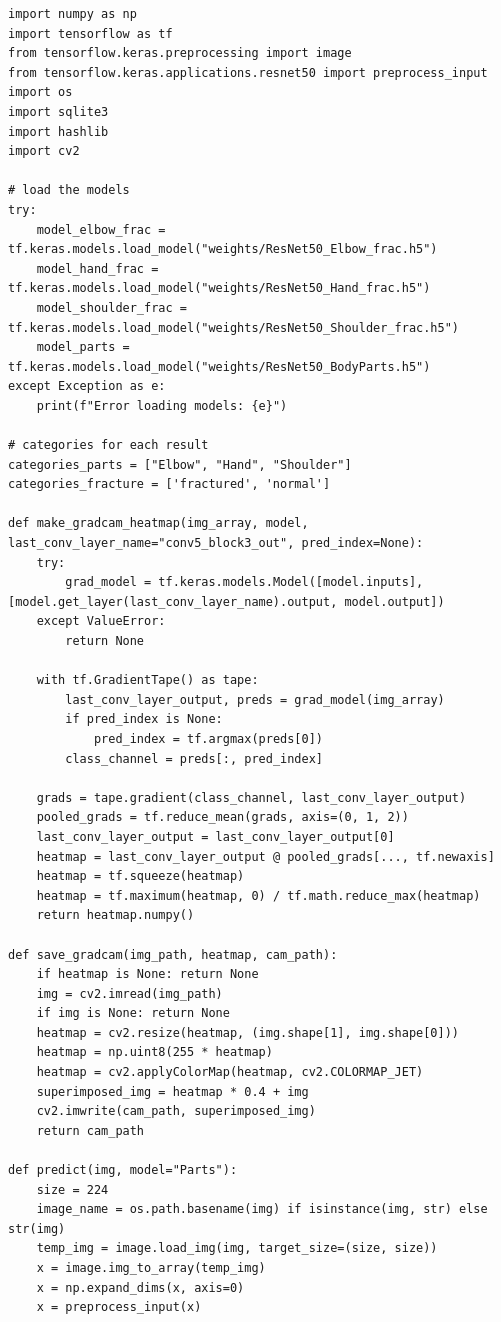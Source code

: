 \documentclass[a4paper,12pt]{report}
\begin{document}
    \begin{lstlisting}[style=pythonstyle]
import numpy as np
import tensorflow as tf
from tensorflow.keras.preprocessing import image
from tensorflow.keras.applications.resnet50 import preprocess_input
import os
import sqlite3
import hashlib
import cv2

# load the models
try:
    model_elbow_frac = tf.keras.models.load_model("weights/ResNet50_Elbow_frac.h5")
    model_hand_frac = tf.keras.models.load_model("weights/ResNet50_Hand_frac.h5")
    model_shoulder_frac = tf.keras.models.load_model("weights/ResNet50_Shoulder_frac.h5")
    model_parts = tf.keras.models.load_model("weights/ResNet50_BodyParts.h5")
except Exception as e:
    print(f"Error loading models: {e}")

# categories for each result
categories_parts = ["Elbow", "Hand", "Shoulder"]
categories_fracture = ['fractured', 'normal']

def make_gradcam_heatmap(img_array, model, last_conv_layer_name="conv5_block3_out", pred_index=None):
    try:
        grad_model = tf.keras.models.Model([model.inputs], [model.get_layer(last_conv_layer_name).output, model.output])
    except ValueError:
        return None

    with tf.GradientTape() as tape:
        last_conv_layer_output, preds = grad_model(img_array)
        if pred_index is None:
            pred_index = tf.argmax(preds[0])
        class_channel = preds[:, pred_index]

    grads = tape.gradient(class_channel, last_conv_layer_output)
    pooled_grads = tf.reduce_mean(grads, axis=(0, 1, 2))
    last_conv_layer_output = last_conv_layer_output[0]
    heatmap = last_conv_layer_output @ pooled_grads[..., tf.newaxis]
    heatmap = tf.squeeze(heatmap)
    heatmap = tf.maximum(heatmap, 0) / tf.math.reduce_max(heatmap)
    return heatmap.numpy()

def save_gradcam(img_path, heatmap, cam_path):
    if heatmap is None: return None
    img = cv2.imread(img_path)
    if img is None: return None
    heatmap = cv2.resize(heatmap, (img.shape[1], img.shape[0]))
    heatmap = np.uint8(255 * heatmap)
    heatmap = cv2.applyColorMap(heatmap, cv2.COLORMAP_JET)
    superimposed_img = heatmap * 0.4 + img
    cv2.imwrite(cam_path, superimposed_img)
    return cam_path

def predict(img, model="Parts"):
    size = 224
    image_name = os.path.basename(img) if isinstance(img, str) else str(img)
    temp_img = image.load_img(img, target_size=(size, size))
    x = image.img_to_array(temp_img)
    x = np.expand_dims(x, axis=0)
    x = preprocess_input(x)


\end{lstlisting}
\end{document}
